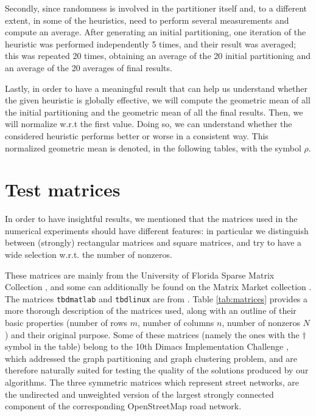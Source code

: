 Secondly, since randomness is involved in the partitioner itself and, to a different extent, in some of the heuristics, need to perform several measurements and compute an average. After generating an initial partitioning, one iteration of the heuristic was performed independently 5 times, and their result was averaged; this was repeated 20 times, obtaining an average of the 20 initial partitioning and an average of the 20 averages of final results. 

Lastly, in order to have a meaningful result that can help us understand whether the given heuristic is globally effective, we will compute the geometric mean of all the initial partitioning and the geometric mean of all the final results. Then, we will normalize w.r.t the first value. Doing so, we can understand whether the considered heuristic performs better or worse in a consistent way. This normalized geometric mean is denoted, in the following tables, with the symbol $\rho$.

\section{Test matrices} \label{sec:test_matrices}

In order to have insightful results, we mentioned that the matrices used in the numerical experiments should have different features: in particular we distinguish between (strongly) rectangular matrices and square matrices, and try to have a wide selection w.r.t. the number of nonzeros. 

These matrices are mainly from the University of Florida Sparse Matrix Collection \cite{ufl}, and some can additionally be found on the Matrix Market collection \cite{matrixmarket}. The matrices \verb|tbdmatlab| and \verb|tbdlinux| are from \cite{mondriaan}. Table \ref{tab:matrices} provides a more thorough description of the matrices used, along with an outline of their basic properties (number of rows $m$, number of columns $n$, number of nonzeros $N$) and their original purpose. Some of these matrices (namely the ones with the $\dagger$ symbol in the table) belong to the 10th Dimacs Implementation Challenge \cite{dimacs}, which addressed the graph partitioning and graph clustering problem, and are therefore naturally suited for testing the quality of the solutions produced by our algorithms. The three symmetric matrices which represent street networks, are the undirected and unweighted version of the largest strongly connected component of the corresponding OpenStreetMap road network.

